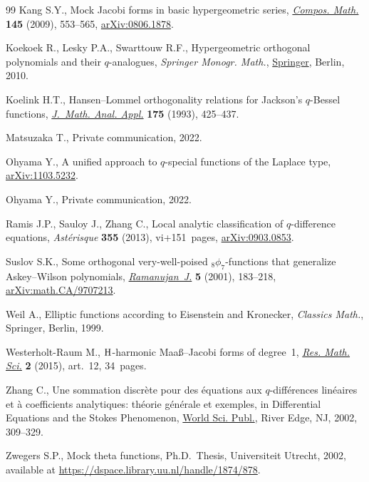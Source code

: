 \documentclass[pdftex]{sigma}
\numberwithin{equation}{section}
\theoremstyle{definition}
\begin{document}
\begin{thebibliography}{99}
Kang S.Y., Mock {J}acobi forms in basic hypergeometric series, \href{https://doi.org/10.1112/S0010437X09004060}{\textit{Compos.
 Math.}} \textbf{145} (2009), 553--565, \href{https://arxiv.org/abs/0806.1878}{arXiv:0806.1878}.

Koekoek R., Lesky P.A., Swarttouw R.F., Hypergeometric orthogonal polynomials
 and their {$q$}-analogues, \textit{Springer Monogr. Math.}, \href{https://doi.org/10.1007/978-3-642-05014-5}{Springer}, Berlin, 2010.

Koelink H.T., Hansen--{L}ommel orthogonality relations for {J}ackson's
 {$q$}-{B}essel functions, \href{https://doi.org/10.1006/jmaa.1993.1181}{\textit{J.~Math. Anal. Appl.}} \textbf{175} (1993),
 425--437.

Matsuzaka T., {P}rivate communication, 2022.

Ohyama Y., A unified approach to $q$-special functions of the {L}aplace type,
 \href{https://arxiv.org/abs/1103.5232}{arXiv:1103.5232}.

Ohyama Y., {P}rivate communication, 2022.

Ramis J.P., Sauloy J., Zhang C., Local analytic classification of
 {$q$}-difference equations, \textit{Ast\'erisque} \textbf{355} (2013),
 vi+151~pages, \href{https://arxiv.org/abs/0903.0853}{arXiv:0903.0853}.

Suslov S.K., Some orthogonal very-well-poised {$_8\phi_7$}-functions that
 generalize {A}skey--{W}ilson polynomials, \href{https://doi.org/10.1023/A:1011439924912}{\textit{Ramanujan~J.}} \textbf{5}
 (2001), 183--218, \href{https://arxiv.org/abs/math.CA/9707213}{arXiv:math.CA/9707213}.

Weil A., Elliptic functions according to {E}isenstein and {K}ronecker, \textit{Classics
 Math.}, Springer, Berlin, 1999.

Westerholt-Raum M., {${\rm H}$}-harmonic {M}aa{\ss}--{J}acobi forms of
 degree~1, \href{https://doi.org/10.1186/s40687-015-0032-y}{\textit{Res. Math. Sci.}} \textbf{2} (2015), art.~12, 34~pages.

Zhang C., Une sommation discr\`ete pour des \'equations aux {$q$}-diff\'erences
 lin\'eaires et \`a coefficients analytiques: th\'eorie g\'en\'erale et
 exemples, in Differential Equations and the {S}tokes Phenomenon, \href{https://doi.org/10.1142/9789812776549_0012}{World Sci.
 Publ.}, River Edge, NJ, 2002, 309--329.

Zwegers S.P., Mock theta functions, Ph.D.~Thesis, {U}niversiteit Utrecht, 2002,
 available at \url{https://dspace.library.uu.nl/handle/1874/878}.

\end{thebibliography}\LastPageEnding
\end{document}

